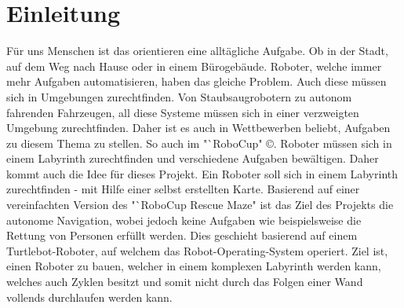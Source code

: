 \section{Einleitung}
{
	Für uns Menschen ist das orientieren eine alltägliche Aufgabe. Ob in der Stadt, auf dem Weg nach Hause oder in einem Bürogebäude. Roboter, welche immer mehr Aufgaben automatisieren, haben das gleiche Problem. Auch diese müssen sich in Umgebungen zurechtfinden. Von Staubsaugrobotern zu autonom fahrenden Fahrzeugen, all diese Systeme müssen sich in einer verzweigten Umgebung zurechtfinden. Daher ist es auch in Wettbewerben beliebt, Aufgaben zu diesem Thema zu stellen. So auch im "`RoboCup" \copyright. Roboter müssen sich in einem Labyrinth zurechtfinden und verschiedene Aufgaben bewältigen. Daher kommt auch die Id\texttt{}ee für dieses Projekt. Ein Roboter soll sich in einem Labyrinth zurechtfinden - mit Hilfe einer selbst erstellten Karte. Basierend auf einer vereinfachten Version des "`RoboCup Rescue Maze" ist das Ziel des Projekts die autonome Navigation, wobei jedoch keine Aufgaben wie beispielsweise die Rettung von Personen erfüllt werden. Dies geschieht basierend auf einem Turtlebot-Roboter, auf welchem das Robot-Operating-System operiert. Ziel ist, einen Roboter zu bauen, welcher in einem komplexen Labyrinth werden kann, welches auch Zyklen besitzt und somit nicht durch das Folgen einer Wand vollends durchlaufen werden kann.
}